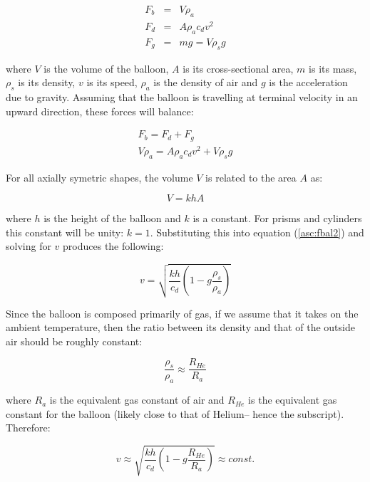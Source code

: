 \documentclass[12pt]{report}
\begin{document}
\begin{flushleft}
\begin{eqnarray}
F_b & = & V \rho_a \\
F_d & = & A \rho_a c_d v^2 \\
F_g & = & m g = V \rho_s g
\end{eqnarray}

where $V$ is the volume of the balloon, $A$ is its cross-sectional area,
$m$ is its mass, $\rho_s$ is its density, $v$ is its speed, 
$\rho_a$ is the density of air and $g$ is the acceleration due to gravity.
Assuming that the balloon is travelling at terminal velocity in an
upward direction, these forces will balance:

\begin{eqnarray}
F_b = F_d + F_g \\
V \rho_a = A \rho_a c_d v^2 + V \rho_s g
\label{asc:fbal2}
\end{eqnarray}

For all axially symetric shapes, the volume $V$ is related to the area $A$ as:

\begin{equation}
V = khA
\end{equation}

where $h$ is the height of the balloon and $k$ is a constant.  For prisms and 
cylinders this constant will be unity: $k=1$.  Substituting this into 
equation (\ref{asc:fbal2}) and solving for $v$ produces the following:

\begin{equation}
v = \sqrt{\frac{k h}{c_d} \left(1 - g \frac{\rho_s}{\rho_a} \right )}
\end{equation}

Since the balloon is composed primarily of gas, if we assume that it takes 
on the ambient temperature, then the ratio between its density
and that of the outside air should be roughly constant:

\begin{equation}
\frac{\rho_s}{\rho_a} \approx \frac{R_{He}}{R_a}
\end{equation}

where $R_a$ is the equivalent gas constant of air and $R_{He}$ is the 
equivalent gas constant for the balloon (likely close to that of Helium--
hence the subscript).  Therefore:

\begin{equation}
v \approx \sqrt{\frac{k h}{c_d} \left(1 - g \frac{R_{He}}{R_a} \right )} \approx const.
\end{equation}


\end{flushleft}
\end{document}
